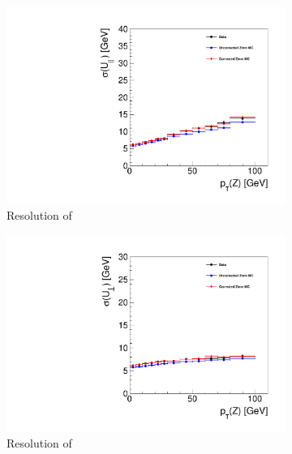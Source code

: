 
\begin{figure}
\centering
\begin{subfigure}{.50\textwidth}
\centering
\includegraphics[width=\linewidth]{plots/Recoil/validation_5/resolution_par.pdf}
 \caption{Resolution of \upar}
\end{subfigure}%
\centering
\begin{subfigure}{.50\textwidth}
\centering
\includegraphics[width=\linewidth]{plots/Recoil/validation_5/resolution_prp.pdf}
\caption{Resolution of \uprp}
\end{subfigure}%
\\
\centering
\begin{subfigure}{.50\textwidth}
\centering

\end{subfigure}
\end{figure}
